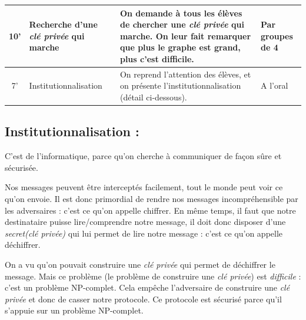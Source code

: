 \documentclass[12pt, a4paper]{article}
\begin{document}
\begin{longtable}{c|m{3.9cm}|m{8.4cm}|m{2.4cm}}
		\\ \hline
		
		10' 
		
		&
		
		Recherche d'une \textit{clé privée} qui marche 
		
		&
		
		On demande à tous les élèves de chercher une \textit{clé privée} qui marche. On leur fait remarquer que plus le graphe est grand, plus c'est difficile.
		
		&
		
		Par groupes de 4
		
		\\ \hline
		
		7'
		
		&
		
		Institutionnalisation
		
		&
		
		On reprend l'attention des élèves, et on présente l'institutionnalisation (détail ci-dessous). 
		
		&
		
		A l'oral
		
	\end{longtable}
	
\newpage
	
\subsection*{Institutionnalisation :}
	
	C’est de l’informatique, parce qu’on cherche à communiquer de façon sûre et sécurisée.
	
	Nos messages peuvent être interceptés facilement, tout le monde peut voir ce qu'on envoie. Il est donc primordial de rendre nos messages incompréhensible par les adversaires : c'est ce qu'on appelle chiffrer. En même temps, il faut que notre destinataire puisse lire/comprendre notre message, il doit donc disposer d'une \textit{secret(clé privée)} qui lui permet de lire notre message : c'est ce qu'on appelle déchiffrer.
	
	On a vu qu'on pouvait construire une \textit{clé privée} qui permet de déchiffrer le message. Mais ce problème (le problème de construire une \textit{clé privée}) est \textit{difficile} : c'est un problème NP-complet. Cela empêche l'adversaire de construire une \textit{clé privée} et donc de casser notre protocole. Ce protocole est sécurisé parce qu'il s'appuie sur un problème NP-complet.
\end{document}
